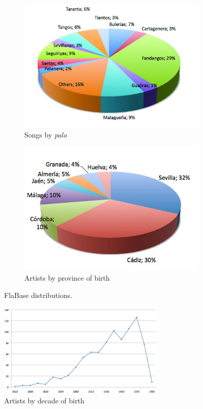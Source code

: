 \begin{figure}[ht!]
    \centering
    \begin{subfigure}{.45\textwidth}
        \centering
        \includegraphics[width=.9\linewidth]{ch05_musicology_pics/Songs-by-palo2.jpg}
    	\caption{Songs by \textit{palo}}
        \label{fig:musicology:graph-palo}
    \end{subfigure}
    \begin{subfigure}{.45\textwidth}
        \centering
        \includegraphics[width=.9\linewidth]{ch05_musicology_pics/Artists-by-province2.jpg}
		\caption{Artists by province of birth}
		\label{fig:musicology:graph-province}
    \end{subfigure}
    \caption{FlaBase distributions.}
\end{figure}


\begin{figure}[!ht]
	\centering
	\includegraphics[width=8cm]{ch05_musicology_pics/Artists-by-decade-of-birth.jpg}
	\caption{Artists by decade of birth 
	\label{fig:musicology:graph-decade}}
\end{figure}

